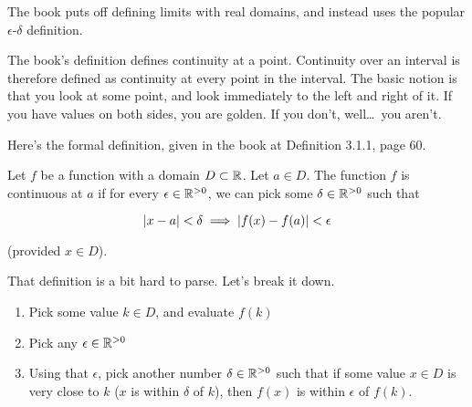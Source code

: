 The book puts off defining limits with real domains, and instead uses the
popular $\epsilon$-$\delta$ definition.

The book's definition defines continuity at a point. Continuity over an interval
is therefore defined as continuity at every point in the interval. The basic
notion is that you look at some point, and look immediately to the left and
right of it. If you have values on both sides, you are golden. If you don't,
well\dots\ you aren't.

Here's the formal definition, given in the book at Definition 3.1.1, page 60.

\begin{definition}
  Let $f$ be a function with a domain $D \subset \mathbb{R}$. Let $a \in D$. The function
  $f$ is continuous at $a$ if for every $\epsilon \in \mathbb{R}^{>0}$, we can pick some
  $\delta \in \mathbb{R}^{>0}$ such that

  \begin{equation}
    \label{eq:contdef}
    \left| x - a \right| < \delta \implies \left| f(x) - f(a) \right| < \epsilon
  \end{equation}

  (provided $x \in D$).
\end{definition}

That definition is a bit hard to parse. Let's break it down.

\begin{enumerate}
\item Pick some value $k \in D$, and evaluate $f(k)$
\item Pick any $\epsilon \in \mathbb{R}^{>0}$
\item Using that $\epsilon$, pick another number $\delta \in \mathbb{R}^{>0}$ such that
  if some value $x \in D$ is very close to $k$ ($x$ is within $\delta$ of $k$),
  then $f(x)$ is within $\epsilon$ of $f(k)$.
\end{enumerate}

